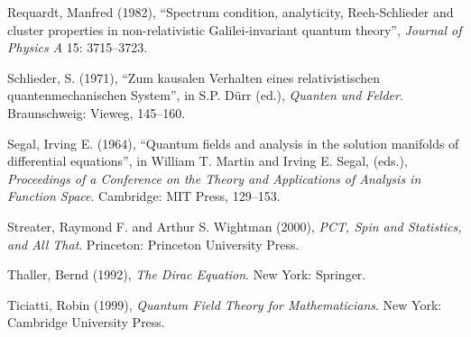 \documentclass[11pt]{article}
\theoremstyle{remark}
\begin{document}
Requardt, Manfred (1982), ``Spectrum condition, analyticity,
Reeh-Schlieder and cluster properties in non-relativistic
Galilei-invariant quantum theory'', {\it Journal of Physics A} 15:
3715--3723.

Schlieder, S. (1971), ``Zum kausalen Verhalten eines relativistischen
quantenmechanischen System'', in S.P. D{\"u}rr (ed.), {\it Quanten und
  Felder}.  Braunschweig: Vieweg, 145--160.

Segal, Irving E. (1964), ``Quantum fields and analysis in the solution
manifolds of differential equations'', in William T. Martin and Irving
E. Segal, (eds.), {\it Proceedings of a Conference on the Theory and
  Applications of Analysis in Function Space}.  Cambridge: MIT Press,
129--153.

Streater, Raymond F. and Arthur S. Wightman (2000), {\it PCT, Spin and
  Statistics, and All That}. Princeton: Princeton University Press.

Thaller, Bernd (1992), {\it The Dirac Equation}.  New York: Springer.

Ticiatti, Robin (1999), {\it Quantum Field Theory for Mathematicians}.
New York: Cambridge University Press.
\end{document}
